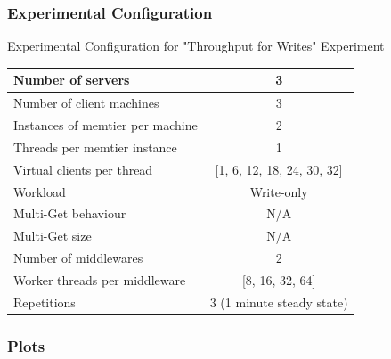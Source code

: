 \documentclass[11pt,a4paper]{article}
\begin{document}
\subsubsection{Experimental Configuration}


\begin{center}
	\scriptsize{
		Experimental Configuration for "Throughput for Writes" Experiment
		\begin{tabular}{|l|c|}
			\hline Number of servers                & 3          \\ 
			\hline Number of client machines        & 3          \\ 
			\hline Instances of memtier per machine & 2          \\ 
			\hline Threads per memtier instance     & 1          \\
			\hline Virtual clients per thread       & [1, 6, 12, 18, 24, 30, 32] \\ 
			\hline Workload                         & Write-only \\
			\hline Multi-Get behaviour               & N/A        \\
			\hline Multi-Get size                   & N/A        \\
			\hline Number of middlewares            & 2          \\
			\hline Worker threads per middleware    & [8, 16, 32, 64]           \\
			\hline Repetitions                      &  3 (1 minute steady state)\\ 
			\hline 
		\end{tabular}
	} 
\end{center}

\subsubsection{Plots}
\end{document}
